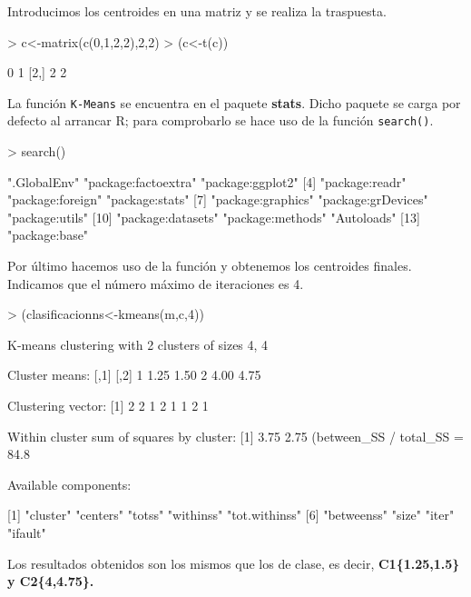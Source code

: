 \documentclass [a4paper] {article}
\begin{document}
\bigskip
Introducimos los centroides en una matriz y se realiza la traspuesta.
\begin{Schunk}
\begin{Sinput}
> c<-matrix(c(0,1,2,2),2,2)
> (c<-t(c))
\end{Sinput}
\begin{Soutput}
     [,1] [,2]
[1,]    0    1
[2,]    2    2
\end{Soutput}
\end{Schunk}

\bigskip
La función \texttt{K-Means} se encuentra en el paquete \textbf{stats}. Dicho paquete se carga por defecto al
arrancar R; para comprobarlo se hace uso de la función \texttt{search()}.
\begin{Schunk}
\begin{Sinput}
> search()
\end{Sinput}
\begin{Soutput}
 [1] ".GlobalEnv"         "package:factoextra" "package:ggplot2"   
 [4] "package:readr"      "package:foreign"    "package:stats"     
 [7] "package:graphics"   "package:grDevices"  "package:utils"     
[10] "package:datasets"   "package:methods"    "Autoloads"         
[13] "package:base"      
\end{Soutput}
\end{Schunk}

\bigskip
Por último hacemos uso de la función y obtenemos los centroides finales. Indicamos que el número máximo de
iteraciones es 4.
\begin{Schunk}
\begin{Sinput}
> (clasificacionns<-kmeans(m,c,4))
\end{Sinput}
\begin{Soutput}
K-means clustering with 2 clusters of sizes 4, 4

Cluster means:
  [,1] [,2]
1 1.25 1.50
2 4.00 4.75

Clustering vector:
[1] 2 2 1 2 1 1 2 1

Within cluster sum of squares by cluster:
[1] 3.75 2.75
 (between_SS / total_SS =  84.8 %

Available components:

[1] "cluster"      "centers"      "totss"        "withinss"     "tot.withinss"
[6] "betweenss"    "size"         "iter"         "ifault"      
\end{Soutput}
\end{Schunk}

\bigskip
Los resultados obtenidos son los mismos que los de clase, es decir, \textbf{C1\{1.25,1.5\} y C2\{4,4.75\}.}
\end{document}
